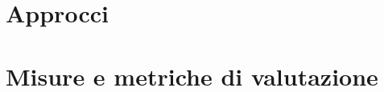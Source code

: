 \documentclass[12pt]{article}
\begin{document}
\section{Approcci} \label{sec:approcci}


\section{Misure e metriche di valutazione} \label{sec:metriche}




\end{document}
